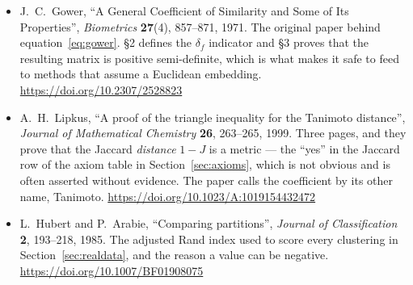 \documentclass[11pt]{article}
\begin{document}
\begin{itemize}[leftmargin=*]
  \item J.\ C.\ Gower, ``A General Coefficient of Similarity and Some of Its
    Properties'', \emph{Biometrics} \textbf{27}(4), 857--871, 1971. The
    original paper behind equation~\eqref{eq:gower}. \S2 defines the
    $\delta_f$ indicator and \S3 proves that the resulting matrix is positive
    semi-definite, which is what makes it safe to feed to methods that assume
    a Euclidean embedding. \url{https://doi.org/10.2307/2528823}
  \item A.\ H.\ Lipkus, ``A proof of the triangle inequality for the Tanimoto
    distance'', \emph{Journal of Mathematical Chemistry} \textbf{26},
    263--265, 1999. Three pages, and they prove that the Jaccard
    \emph{distance} $1 - J$ is a metric --- the ``yes'' in the Jaccard row
    of the axiom table in Section~\ref{sec:axioms}, which is not obvious and
    is often asserted without evidence. The paper calls the coefficient by
    its other name, Tanimoto. \url{https://doi.org/10.1023/A:1019154432472}
  \item L.\ Hubert and P.\ Arabie, ``Comparing partitions'',
    \emph{Journal of Classification} \textbf{2}, 193--218, 1985. The adjusted
    Rand index used to score every clustering in
    Section~\ref{sec:realdata}, and the reason a value can be negative.
    \url{https://doi.org/10.1007/BF01908075}
\end{itemize}

\notesources{\AMLUnitVIISources}
\end{document}
